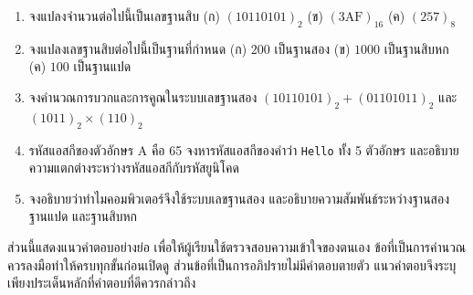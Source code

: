 \QAChapter
\begin{enumerate}
    \item จงแปลงจำนวนต่อไปนี้เป็นเลขฐานสิบ (ก) $(10110101)_2$ (ข) $(3\mathrm{AF})_{16}$ (ค) $(257)_8$
    \item จงแปลงเลขฐานสิบต่อไปนี้เป็นฐานที่กำหนด (ก) $200$ เป็นฐานสอง (ข) $1000$ เป็นฐานสิบหก (ค) $100$ เป็นฐานแปด
    \item จงคำนวณการบวกและการคูณในระบบเลขฐานสอง $(10110101)_2 + (01101011)_2$ และ $(1011)_2 \times (110)_2$
    \item รหัสแอสกีของตัวอักษร A คือ 65 จงหารหัสแอสกีของคำว่า \texttt{Hello} ทั้ง 5 ตัวอักษร และอธิบายความแตกต่างระหว่างรหัสแอสกีกับรหัสยูนิโคด
    \item จงอธิบายว่าทำไมคอมพิวเตอร์จึงใช้ระบบเลขฐานสอง และอธิบายความสัมพันธ์ระหว่างฐานสอง ฐานแปด และฐานสิบหก
\end{enumerate}

ส่วนนี้แสดงแนวคำตอบอย่างย่อ เพื่อให้ผู้เรียนใช้ตรวจสอบความเข้าใจของตนเอง ข้อที่เป็นการคำนวณควรลงมือทำให้ครบทุกขั้นก่อนเปิดดู ส่วนข้อที่เป็นการอภิปรายไม่มีคำตอบตายตัว แนวคำตอบจึงระบุเพียงประเด็นหลักที่คำตอบที่ดีควรกล่าวถึง

